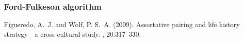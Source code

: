 \documentclass[12pt]{article} %
\begin{document}
\subsubsection{Ford-Fulkeson algorithm}


\begin{thebibliography}{99} %

Figueredo, A.~J. and Wolf, P. S.~A. (2009).
\newblock Assortative pairing and life history strategy - a cross-cultural
  study.
, 20:317--330.
 
\end{thebibliography}

\end{document}
